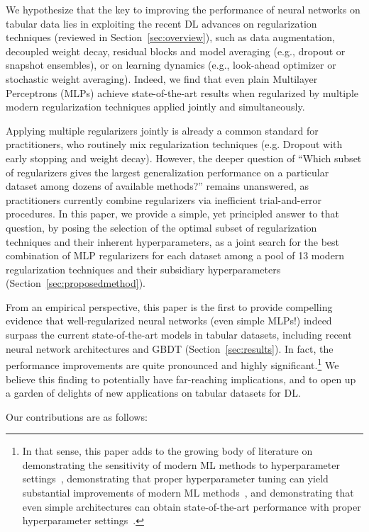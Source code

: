 We hypothesize that the key to improving the performance of neural networks on tabular data lies in exploiting the recent DL advances on regularization techniques (reviewed in Section~\ref{sec:overview}), such as data augmentation, decoupled weight decay, residual blocks and model averaging (e.g., dropout or snapshot ensembles), or on learning dynamics (e.g., look-ahead optimizer or stochastic weight averaging). Indeed, we find that even plain  Multilayer Perceptrons (MLPs) achieve state-of-the-art results when regularized by multiple modern regularization techniques applied jointly and simultaneously.

Applying multiple regularizers jointly is already a common standard for practitioners, who routinely mix regularization techniques (e.g. Dropout with early stopping and weight decay). However, the deeper question of ``Which subset of regularizers gives the largest generalization performance on a particular dataset among dozens of available methods?'' remains unanswered, as practitioners currently combine regularizers via inefficient trial-and-error procedures. In this paper, we provide a simple, yet principled answer to that question, by posing the selection of the optimal subset of regularization techniques and their inherent hyperparameters, as a joint search for the best combination of MLP regularizers for each dataset among a pool of 13 modern regularization techniques and their subsidiary hyperparameters (Section~\ref{sec:proposedmethod}). 

From an empirical perspective, this paper is the first to provide compelling evidence that well-regularized neural networks (even simple MLPs!) indeed surpass the current state-of-the-art models in tabular datasets, including recent neural network architectures and GBDT (Section~\ref{sec:results}). In fact, the performance improvements are quite pronounced and highly significant.\footnote{In that sense, this paper adds to the growing body of literature on demonstrating the sensitivity of modern ML methods to hyperparameter settings~\citep{henderson-aaai18a}, demonstrating that proper hyperparameter tuning can yield substantial improvements of modern ML methods~\citep{chen_arxiv18}, and demonstrating that even simple architectures can obtain state-of-the-art performance with proper hyperparameter settings~\citep{melis2018on}.} We believe this finding to potentially have far-reaching implications, and to open up a garden of delights of new applications on tabular datasets for DL. 

Our contributions are as follows:

